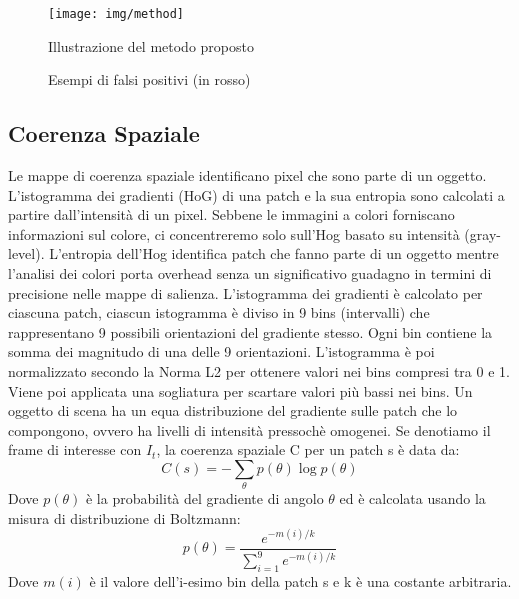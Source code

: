 \documentclass[12pt,twocolumn]{IEEEtran}
\begin{document}
		\begin{figure}[h]
		\caption{Illustrazione del metodo proposto}
		\begin{center}
		\texttt{[image: img/method]}
		\end{center}
		\end{figure}
		\begin{figure}[h]
		\caption{Esempi di falsi positivi (in rosso)}
		\begin{center}
		\hspace*{.2cm}
		\hspace*{.2cm}
		\end{center}
		\end{figure}
		
		\subsection{Coerenza Spaziale}
			Le mappe di coerenza spaziale identificano pixel che sono parte di un oggetto. L'istogramma dei gradienti (HoG) di una patch e la sua entropia sono calcolati a partire dall'intensità di un pixel. Sebbene le immagini a colori forniscano informazioni sul colore, ci concentreremo solo sull'Hog basato su intensità (gray-level). L'entropia dell'Hog identifica patch che fanno parte di un oggetto mentre l'analisi dei colori porta overhead senza un significativo guadagno in termini di precisione nelle mappe di salienza.\newline
			L'istogramma dei gradienti è calcolato per ciascuna patch, ciascun istogramma è diviso in 9 bins (intervalli) che rappresentano 9 possibili orientazioni del gradiente stesso. Ogni bin contiene la somma dei magnitudo di una delle 9 orientazioni. L'istogramma è poi normalizzato secondo la Norma L2 per ottenere valori nei bins compresi tra 0 e 1.
			Viene poi applicata una sogliatura per scartare valori più bassi nei bins.\newline
			Un oggetto di scena ha un equa distribuzione del gradiente sulle patch che lo compongono, ovvero ha livelli di intensità pressochè omogenei.	Se denotiamo il frame di interesse con $I_{t}$, la coerenza spaziale C per un patch s è data da:\newline
			\begin{equation}
			C(s) = -\sum_{\theta}p(\theta)\log p(\theta)
			\end{equation}
			Dove $p(\theta)$ è la probabilità del gradiente di angolo $\theta$ ed è calcolata usando la misura di distribuzione di Boltzmann:
			\begin{equation}
			p(\theta)= \frac{e^{-m(i)/k}}{\sum_{i=1}^{9}e^{-m(i)/k}}
			\end{equation}
			Dove $m(i)$ è il valore dell'i-esimo bin della patch s e k è una costante arbitraria.
\end{document}
